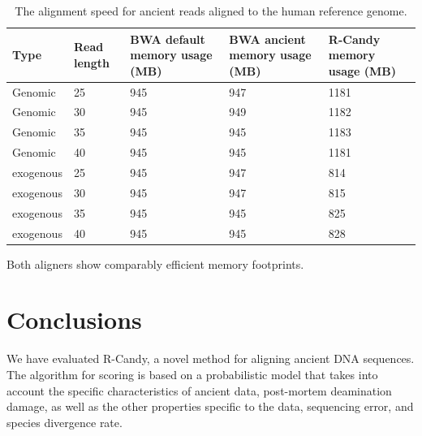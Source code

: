 \documentclass[11pt,a4paper]{report}
\begin{document}
\begin{table}[H]
\center
    \begin{tabular}{ | l |p{1.25cm} | p{2cm} | p{2cm} |p{1.75cm}| }
    \hline
  	\textbf{\footnotesize Type} & \textbf{\footnotesize Read length }&\textbf{\footnotesize BWA  
  		default memory usage (MB) }
  	&\textbf{\footnotesize BWA ancient memory usage (MB)} 
  	& \textbf{\footnotesize R-Candy memory usage (MB) }\\ \hline
 	  Genomic    & 25  & 945 &  947   &  1181 \\ \hline
      Genomic    & 30  & 945 &  949  &  1182 \\ \hline
      Genomic    & 35  & 945 &  945   &  1183 \\ \hline
 	  Genomic	 & 40  & 945 &  945   &  1181 \\ \hline
 	  exogenous  & 25  & 945 &  947   &  814 \\ \hline
      exogenous  & 30  & 945 &  947   &  815 \\ \hline
 	  exogenous  & 35  & 945 &  945   &  825 \\ \hline
 	  exogenous  & 40  & 945 &  945   &  828 \\ \hline
   \end{tabular}
\caption{The alignment speed for ancient reads aligned to 
the human reference genome.}
\label{speed-RG}
\end{table}

Both aligners show comparably efficient memory footprints.






\section{Conclusions} \label{Conclusions}


We have evaluated R-Candy, a novel method for aligning ancient DNA sequences.
The algorithm for scoring is based on a probabilistic model that takes into account 
the specific characteristics of ancient data, post-mortem deamination damage, as 
well as the other properties specific to the data, sequencing error, and species
divergence rate. \\
\end{document}
